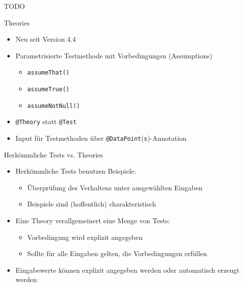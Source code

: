 \begin{frame}{TODO}
\end{frame}

\begin{frame}{Theories}
	\begin{itemize}
		\item Neu seit Version 4.4
		\item Parametrisierte Testmethode mit Vorbedingungen (Assumptions)
			\begin{itemize}
				\item \texttt{assumeThat()}
				\item \texttt{assumeTrue()}
				\item \texttt{assumeNotNull()}
			\end{itemize}
		\item \texttt{@Theory} statt \texttt{@Test}
		\item Input für Testmethoden über \texttt{@DataPoint}(\texttt{s})-Annotation
	\end{itemize}
\end{frame}

\begin{frame}{Herkömmliche Tests vs. Theories}
	\begin{itemize}
		\item Herkömmliche Tests benutzen Beispiele:
			\begin{itemize}
				\item Überprüfung des Verhaltens unter ausgewählten Eingaben
				\item Beispiele sind (hoffentlich) charakteristisch
			\end{itemize}
		\item Eine Theory verallgemeinert eine Menge von Tests:
			\begin{itemize}
				\item Vorbedingung wird explizit angegeben
				\item Sollte für alle Eingaben gelten, die Vorbedingungen erfüllen
			\end{itemize}
		\item Eingabewerte können explizit angegeben werden oder automatisch erzeugt werden
	\end{itemize}
\end{frame}

